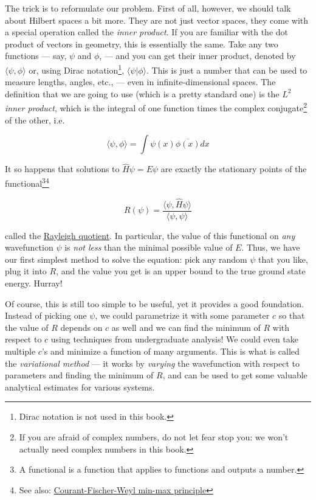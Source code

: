 \documentclass{article}
\begin{document}
The trick is to reformulate our problem. First of all, however, we should talk about Hilbert spaces a bit more. They are not just vector spaces, they come with a special operation called the \textit{inner product}. If you are familiar with the dot product of vectors in geometry, this is essentially the same. Take any two functions --- say, \(\psi\) and \(\phi\), --- and you can get their inner product, denoted by \(\langle \psi, \phi \rangle\) or, using Dirac notation\footnote{Dirac notation is not used in this book.}, \(\langle \psi | \phi \rangle\). This is just a number that can be used to measure lengths, angles, etc., --- even in infinite-dimensional spaces. The definition that we are going to use (which is a pretty standard one) is the \textit{\(L^2\) inner product}, which is the integral of one function times the complex conjugate\footnote{If you are afraid of complex numbers, do not let fear stop you: we won't actually need complex numbers in this book.} of the other, i.e.

\begin{equation} \label{eq:l2prod} \langle \psi, \phi \rangle = \int \psi(x) \overline{\phi(x)} dx \end{equation}

It so happens\textsuperscript{\cite{ref:atkins}} that solutions to \(\hat H \psi = E \psi\) are exactly the stationary points of the functional\footnote{A functional is a function that applies to functions and outputs a number.}\footnote{See also: \href{https://en.wikipedia.org/wiki/Min-max_theorem\#Self-adjoint_operators}{Courant-Fischer-Weyl min-max principle}}

\begin{equation} \label{eq:rayleigh} R(\psi) = \frac{\langle \psi, \hat H \psi \rangle}{\langle \psi, \psi \rangle} \end{equation}

called the \href{https://en.wikipedia.org/wiki/Rayleigh_quotient}{Rayleigh quotient}. In particular, the value of this functional on \textit{any} wavefunction \(\psi\) is \textit{not less} than the minimal possible value of \(E\). Thus, we have our first simplest method to solve the equation: pick any random \(\psi\) that you like, plug it into \(R\), and the value you get is an upper bound to the true ground state energy. Hurray!

Of course, this is still too simple to be useful, yet it provides a good foundation. Instead of picking one \(\psi\), we could parametrize it with some parameter \(c\) so that the value of \(R\) depends on \(c\) as well and we can find the minimum of \(R\) with respect to \(c\) using techniques from undergraduate analysis!\textsuperscript{\cite{ref:atkins}} We could even take multiple \(c\)'s and minimize a function of many arguments. This is what is called the \textit{variational method} --- it works by \textit{varying} the wavefunction with respect to parameters and finding the minimum of \(R\), and can be used to get some valuable analytical estimates for various systems\textsuperscript{\cite{ref:atkins}}.
\end{document}
